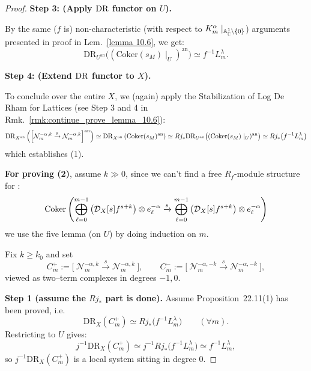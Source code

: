 \begin{proof}
    \medskip

    \noindent\textbf{Step 3: (Apply $\mathrm{DR}$ functor on $U$).}

    By the same ($f$ is) non-characteristic (with respect to $K^\alpha_m\mid_{\mathbb{A}^1_{\mathbb{C}} \setminus \{0\}}$) arguments presented in proof in Lem.~\ref{lemma 10.6}, we get:
    \[
        \mathrm{DR}_{U^\mathrm{an}} \big( (\mathrm{Coker}(s_M)\mid_U)^{\mathrm{an}} \big) \simeq f^{-1} L_m^{\lambda}.
    \]

    \medskip

    \noindent\textbf{Step 4: (Extend $\mathrm{DR}$ functor to $X$).}

    To conclude over the entire $X$, we (again) apply the Stabilization of Log De Rham for Lattices (see Step 3 and 4 in Rmk.~\ref{rmk:continue_prove_lemma_10.6}):
    \[
        \mathrm{DR}_{X^\mathrm{an}} \left(\left[\mathcal{N}_m^{-\alpha,k} \xrightarrow{s} \mathcal{N}_m^{-\alpha,k}\right]^\mathrm{an}\right) \simeq \mathrm{DR}_{X^\mathrm{an}} \left(\mathrm{Coker}(s_M)^\mathrm{an}\right) \simeq Rj_*\mathrm{DR}_{U^\mathrm{an}} \big( (\mathrm{Coker}(s_M)\mid_U)^{\mathrm{an}} \big)  \simeq Rj_*\big(f^{-1} L_m^\lambda\big)
    \]
    which establishes (1).

    \bigskip

    \noindent\textbf{For proving (2)}, assume $k\gg 0$, since we can't find a free $R_f$-module structure for :
    \[
        \mathrm{Coker}\left(\bigoplus_{\ell=0}^{m-1} \left(\mathcal{D}_X[s]f^{s+k}\right) \otimes e_{\ell}^{-\alpha} \xrightarrow{s} \bigoplus_{\ell=0}^{m-1} \left(\mathcal{D}_X[s]f^{s+k}\right) \otimes e_{\ell}^{-\alpha}\right)
    \]
    we use the five lemma (on $U$) by doing induction on $m$.

    Fix $k\ge k_0$ and set
    \[
        C_m^{+}:=\Big[\ \mathcal N_m^{-\alpha,k}\xrightarrow{s}\mathcal N_m^{-\alpha,k}\ \Big],\qquad
        C_m^{-}:=\Big[\ \mathcal N_m^{-\alpha,-k}\xrightarrow{s}\mathcal N_m^{-\alpha,-k}\ \Big],
    \]
    viewed as two--term complexes in degrees $-1, 0$.

    \medskip

    \noindent\textbf{Step 1 (assume the $Rj_*$ part is done).}
    Assume Proposition~22.11(1) has been proved, i.e.
    \[
        \mathrm{DR}_X(C_m^{+})\simeq Rj_*\bigl(f^{-1}L_m^\lambda\bigr)\qquad(\forall m).
    \]
    Restricting to $U$ gives:
    \[
        j^{-1}\mathrm{DR}_X(C_m^{+})
        \simeq j^{-1}Rj_*\bigl(f^{-1}L_m^\lambda\bigr)
        \simeq f^{-1}L_m^\lambda,
    \]
    so $j^{-1}\mathrm{DR}_X(C_m^{+})$ is a local system sitting in degree $0$.


\end{proof}
